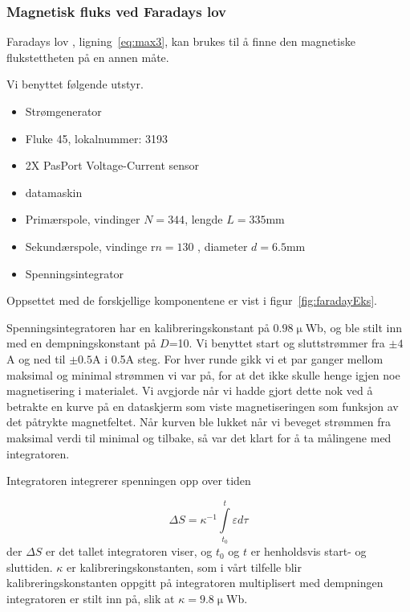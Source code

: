 \documentclass[a4paper,11pt, twocolumn]{article}
\begin{document}
\subsubsection{Magnetisk fluks ved Faradays lov}
Faradays lov , ligning~\eqref{eq:max3}, kan brukes til å finne den magnetiske flukstettheten på en annen måte.

Vi benyttet følgende utstyr.
\begin{itemize}
	\item Strømgenerator
	\item Fluke 45, lokalnummer: 3193
	\item 2X PasPort Voltage-Current sensor
	\item datamaskin
	\item Primærspole, vindinger $N = 344$, lengde $L = 335$mm 
	\item Sekundærspole, vindinge r$n = 130$ , diameter $d = 6.5$mm 
	\item Spenningsintegrator
\end{itemize}

Oppsettet med de forskjellige komponentene er vist i figur~\ref{fig:faradayEks}. 

Spenningsintegratoren har en kalibreringskonstant på $0.98\upmu$Wb, og ble stilt inn med en dempningskonstant på $D$=10. Vi benyttet start og sluttstrømmer fra $\pm4$A og ned til $\pm0.5$A i 0.5A steg. For hver runde gikk vi et par ganger mellom maksimal og minimal strømmen vi var på, for at det ikke skulle henge igjen noe magnetisering i materialet. Vi avgjorde når vi hadde gjort dette nok ved å betrakte en kurve på en dataskjerm som viste magnetiseringen som funksjon av det påtrykte magnetfeltet. Når kurven ble lukket når vi beveget strømmen fra maksimal verdi til minimal og tilbake, så var det klart for å ta målingene med integratoren.

Integratoren integrerer spenningen opp over tiden

\begin{equation}
	\Delta S = \kappa^{-1}\int\limits_{t_0}^t \varepsilon d\tau
	\label{eq:spenningsint}
\end{equation}
der $\Delta S$ er det tallet integratoren viser, og $t_0$ og $t$ er henholdsvis start- og sluttiden. $\kappa$ er kalibreringskonstanten, som i vårt tilfelle blir kalibreringskonstanten oppgitt på integratoren multiplisert med dempningen integratoren er stilt inn på, slik at $\kappa=9.8\upmu$Wb.
\end{document}
